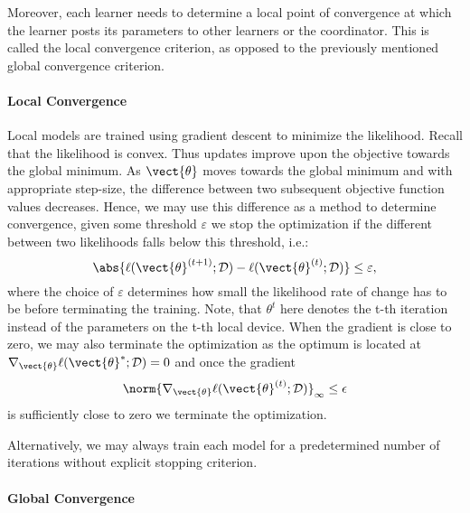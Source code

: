 Moreover, each learner needs to determine a local point of convergence at which the learner posts its parameters to other learners or the coordinator. 
This is called the local convergence criterion, as opposed to the previously mentioned global convergence criterion.

\paragraph*{Local Convergence}
Local models are trained using gradient descent to minimize the likelihood. 
Recall that the likelihood is convex. 
Thus updates improve upon the objective towards the global minimum.
As $\vect{\theta}$ moves towards the global minimum and with appropriate step-size, the difference between two subsequent objective function values decreases.
Hence, we may use this difference as a method to determine convergence, given some threshold $\varepsilon$ we stop the optimization if the different between two likelihoods falls below this threshold, i.e.:
\begin{equation}
    \label{eq:stopcrit}
    \abs{\ell(\vect{\theta}^{(t+1)} ; \mathcal{D}) - \ell(\vect{\theta}^{(t)} ; \mathcal{D})} \leq \varepsilon,
\end{equation}
where the choice of $\varepsilon$ determines how small the likelihood rate of change has to be before terminating the training.
Note, that $\theta^t$ here denotes the t-th iteration instead of the parameters on the t-th local device.
When the gradient is close to zero, we may also terminate the optimization as the optimum is located at $\nabla_{\vect{\theta}} \ell(\vect{\theta}^{*} ; \mathcal{D}) = 0$ and once the gradient
\begin{equation}
    \norm{\nabla_{\vect{\theta}} \ell(\vect{\theta}^{(t)} ; \mathcal{D})}_{\infty} \leq \epsilon
\end{equation}
is sufficiently close to zero we terminate the optimization. 

Alternatively, we may always train each model for a predetermined number of iterations without explicit stopping criterion.

\paragraph*{Global Convergence}

